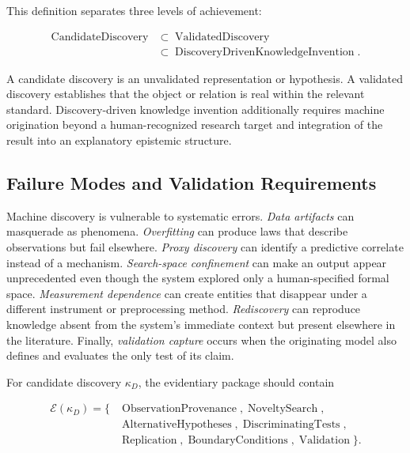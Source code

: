 This definition separates three levels of achievement:

\begin{equation}
\begin{aligned}
\operatorname{CandidateDiscovery}
&\subset
\operatorname{ValidatedDiscovery}\\
&\subset
\operatorname{DiscoveryDrivenKnowledgeInvention}.
\end{aligned}
\label{eq:discovery_levels}
\end{equation}

A candidate discovery is an unvalidated representation or hypothesis. A
validated discovery establishes that the object or relation is real within the
relevant standard. Discovery-driven knowledge invention additionally requires
machine origination beyond a human-recognized research target and integration
of the result into an explanatory epistemic structure.

\subsection{\textbf{Failure Modes and Validation Requirements}}

Machine discovery is vulnerable to systematic errors. \emph{Data artifacts}
can masquerade as phenomena. \emph{Overfitting} can produce laws that describe
observations but fail elsewhere. \emph{Proxy discovery} can identify a
predictive correlate instead of a mechanism. \emph{Search-space confinement}
can make an output appear unprecedented even though the system explored only a
human-specified formal space. \emph{Measurement dependence} can create entities
that disappear under a different instrument or preprocessing method.
\emph{Rediscovery} can reproduce knowledge absent from the system's immediate
context but present elsewhere in the literature. Finally,
\emph{validation capture} occurs when the originating model also defines and
evaluates the only test of its claim.

For candidate discovery $\kappa_D$, the evidentiary package should contain

\begin{equation}
\begin{aligned}
\mathcal{E}(\kappa_D)=\{&
\operatorname{ObservationProvenance},
\operatorname{NoveltySearch},\\
&\operatorname{AlternativeHypotheses},
\operatorname{DiscriminatingTests},\\
&\operatorname{Replication},
\operatorname{BoundaryConditions},
\operatorname{Validation}\}.
\end{aligned}
\label{eq:discovery_evidence}
\end{equation}


